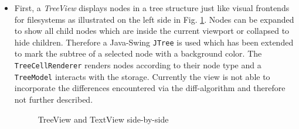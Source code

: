 \begin{itemize}
\item
First, a \emph{TreeView} displays nodes in a tree structure just like visual frontends for filesystems as illustrated on the left side in Fig. \ref{fig:treetextview}. Nodes can be expanded to show all child nodes which are inside the current viewport or collapsed to hide children. Therefore a Java-Swing \texttt{JTree} is used which has been extended to mark the subtree of a selected node with a background color. The \texttt{TreeCellRenderer} renders nodes according to their node type and a \texttt{TreeModel} interacts with the storage. Currently the view is not able to incorporate the differences encountered via the diff-algorithm and therefore not further described.

\begin{figure}[tb]
\caption{\label{fig:treetextview} TreeView and TextView side-by-side}
\end{figure}


\end{itemize}
